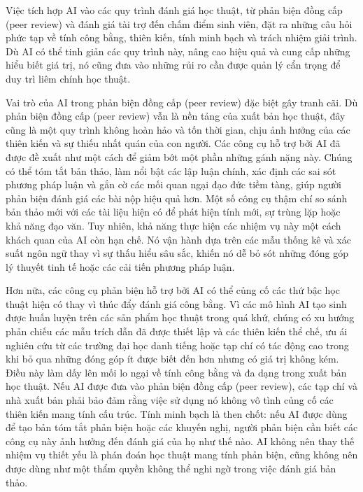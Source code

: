 Việc tích hợp AI vào các quy trình đánh giá học thuật, từ phản biện đồng cấp (peer review) và đánh giá tài trợ đến chấm điểm sinh viên, đặt ra những câu hỏi phức tạp về tính công bằng, thiên kiến, tính minh bạch và trách nhiệm giải trình. Dù AI có thể tinh giản các quy trình này, nâng cao hiệu quả và cung cấp những hiểu biết giá trị, nó cũng đưa vào những rủi ro cần được quản lý cẩn trọng để duy trì liêm chính học thuật.

Vai trò của AI trong phản biện đồng cấp (peer review) đặc biệt gây tranh cãi. Dù phản biện đồng cấp (peer review) vẫn là nền tảng của xuất bản học thuật, đây cũng là một quy trình không hoàn hảo và tốn thời gian, chịu ảnh hưởng của các thiên kiến và sự thiếu nhất quán của con người. Các công cụ hỗ trợ bởi AI đã được đề xuất như một cách để giảm bớt một phần những gánh nặng này. Chúng có thể tóm tắt bản thảo, làm nổi bật các lập luận chính, xác định các sai sót phương pháp luận và gắn cờ các mối quan ngại đạo đức tiềm tàng, giúp người phản biện đánh giá các bài nộp hiệu quả hơn. Một số công cụ thậm chí so sánh bản thảo mới với các tài liệu hiện có để phát hiện tính mới, sự trùng lặp hoặc khả năng đạo văn. Tuy nhiên, khả năng thực hiện các nhiệm vụ này một cách khách quan của AI còn hạn chế. Nó vận hành dựa trên các mẫu thống kê và xác suất ngôn ngữ thay vì sự thấu hiểu sâu sắc, khiến nó dễ bỏ sót những đóng góp lý thuyết tinh tế hoặc các cải tiến phương pháp luận.

Hơn nữa, các công cụ phản biện hỗ trợ bởi AI có thể củng cố các thứ bậc học thuật hiện có thay vì thúc đẩy đánh giá công bằng. Vì các mô hình AI tạo sinh được huấn luyện trên các sản phẩm học thuật trong quá khứ, chúng có xu hướng phản chiếu các mẫu trích dẫn đã được thiết lập và các thiên kiến thể chế, ưu ái nghiên cứu từ các trường đại học danh tiếng hoặc tạp chí có tác động cao trong khi bỏ qua những đóng góp ít được biết đến hơn nhưng có giá trị không kém. Điều này làm dấy lên mối lo ngại về tính công bằng và đa dạng trong xuất bản học thuật. Nếu AI được đưa vào phản biện đồng cấp (peer review), các tạp chí và nhà xuất bản phải bảo đảm rằng việc sử dụng nó không vô tình củng cố các thiên kiến mang tính cấu trúc. Tính minh bạch là then chốt: nếu AI được dùng để tạo bản tóm tắt phản biện hoặc các khuyến nghị, người phản biện cần biết các công cụ này ảnh hưởng đến đánh giá của họ như thế nào. AI không nên thay thế nhiệm vụ thiết yếu là phán đoán học thuật mang tính phản biện, cũng không nên được dùng như một thẩm quyền không thể nghi ngờ trong việc đánh giá bản thảo.

